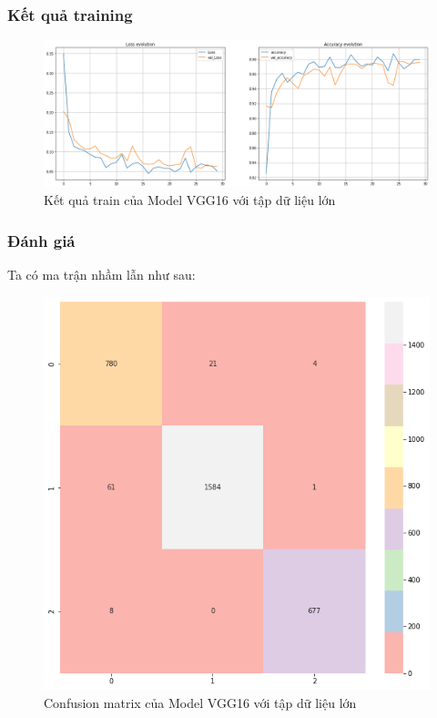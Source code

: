\subsubsection{Kết quả training}\newpage
\begin{center}
    \begin{figure}[!h]
        \centering
        \includegraphics[scale = 0.38]{fileanh/vgg16_increase.png}
        \caption{Kết quả train của Model VGG16 với tập dữ liệu lớn}
    \end{figure}
\end{center}
\subsubsection{Đánh giá}
Ta có ma trận nhầm lẫn như sau:
\begin{center}
    \begin{figure}[!h]
        \centering
        \includegraphics[scale = 0.39]{fileanh/vgg16_increase1.png}
        \caption{Confusion matrix của Model VGG16 với tập dữ liệu lớn}
    \end{figure}
\end{center}

